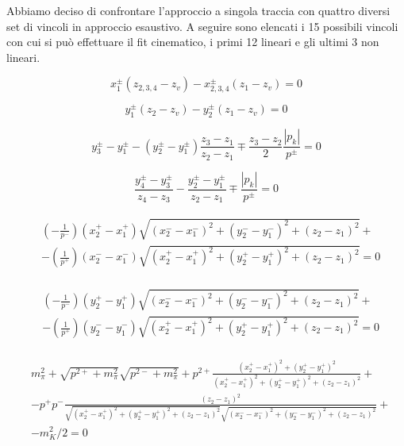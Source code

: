 \documentclass[8pt]{extarticle}
\begin{document}
Abbiamo deciso di confrontare l'approccio a singola traccia con quattro diversi set di vincoli in approccio esaustivo. A seguire sono elencati i 15 possibili vincoli con cui si può effettuare il fit cinematico, i primi 12 lineari e gli ultimi 3 non lineari.

\begin{equation}
x_1^{\pm} (z_{2,3,4} - z_v) - x_{2,3,4}^{\pm} (z_1 - z_v) = 0
\end{equation}

\begin{equation}
y_1^{\pm} (z_{2} - z_v) - y_{2}^{\pm} (z_1 - z_v) = 0
\end{equation}

\begin{equation}
y_3^{\pm} - y_1^{\pm} - (y_2^{\pm}-y_1^{\pm})\frac{z_3-z_1}{z_2-z_1} \mp \frac{z_3-z_2}{2} \frac{|p_k|}{p^{\pm}} = 0
\label{eq:curvaturay3}
\end{equation}

\begin{equation}
\frac{y_4^{\pm}-y_3^{\pm}}{z_4-z_3} - \frac{y_2^{\pm}-y_1^{\pm}}{z_2-z_1} \mp \frac{|p_k|}{p^{\pm}} = 0
\end{equation}

\begin{align}
\begin{split}
&(-\frac{1}{p^-}) (x_2^+ - x_1^+) \sqrt{(x_2^- - x_1^-)^2 + (y_2^- - y_1^-)^2 + (z_2 - z_1)^2} + \\
& - (\frac{1}{p^+}) (x_2^- - x_1^-) \sqrt{(x_2^+ - x_1^+)^2 + (y_2^+ - y_1^+)^2 + (z_2 - z_1)^2} = 0 
\end{split}
\end{align}

\begin{align}
\begin{split}
&(-\frac{1}{p^-}) (y_2^+ - y_1^+) \sqrt{(x_2^- - x_1^-)^2 + (y_2^- - y_1^-)^2 + (z_2 - z_1)^2} + \\
& - (\frac{1}{p^+}) (y_2^- - y_1^-) \sqrt{(x_2^+ - x_1^+)^2 + (y_2^+ - y_1^+)^2 + (z_2 - z_1)^2} = 0 
\end{split}
\end{align}

\begin{align}
\begin{split}
&m_\pi^2 + \sqrt{p^{2+} + m_\pi^2}\sqrt{p^{2-} + m_\pi^2} + p^{2+} \frac{(x_2^+ - x_1^+)^2 + (y_2^+ - y_1^+)^2}{(x_2^+ - x_1^+)^2 + (y_2^+ - y_1^+)^2 + (z_2 - z_1)^2} + \\
& -p^+ p^- \frac{(z_2-z_1)^2}{\sqrt{(x_2^+ - x_1^+)^2 + (y_2^+ - y_1^+)^2 + (z_2 - z_1)^2}\sqrt{(x_2^- - x_1^-)^2 + (y_2^- - y_1^-)^2 + (z_2 - z_1)^2}} + \\
& -m_K^2/2 = 0
\end{split}
\end{align}
\end{document}
